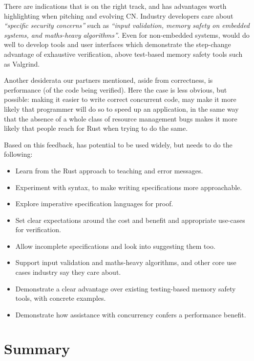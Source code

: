 There are indications that  is on the right track, and has advantages
worth highlighting when pitching and evolving CN.\@
Industry developers care about \emph{``specific security concerns''} such as
\emph{``input validation, memory safety on embedded systems, and maths-heavy
algorithms''}. Even for non-embedded systems,  would do well to develop
tools and user interfaces which demonstrate the step-change advantage of
exhaustive verification, above test-based memory safety tools such as Valgrind.

Another desiderata our partners mentioned, aside from correctness, is
performance (of the code being verified). Here the case is less obvious, but
possible: making it easier to write correct concurrent code, may make it more
likely that programmer will do so to speed up an application, in the same way
that the absence of a whole class of resource management bugs makes it more
likely that people reach for Rust when trying to do the same.

Based on this feedback,  has potential to be used widely, but needs to
do the following:
\begin{itemize}
    \item Learn from the Rust approach to teaching and error messages.
    \item Experiment with syntax, to make writing specifications more
        approachable.
    \item Explore imperative specification languages for proof.
    \item Set clear expectations around the cost and benefit and appropriate
        use-cases for verification.
    \item Allow incomplete specifications and look into suggesting them too.
    \item Support input validation and maths-heavy algorithms, and other core
        use cases industry say they care about.
    \item Demonstrate a clear advantage over existing testing-based memory
        safety tools, with concrete examples.
    \item Demonstrate how assistance with concurrency confers a performance
        benefit.
\end{itemize}

\section{Summary}

